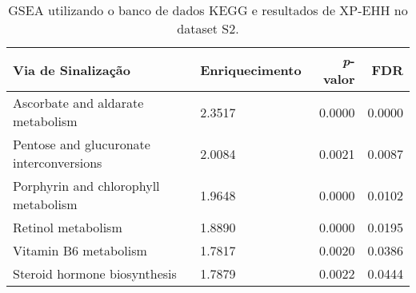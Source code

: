 \begin{table}[!htbp]
\centering

\begin{tabularx}{.9\textwidth}{Xlrr}

\toprule
Via de Sinalização & Enriquecimento & \emph{p}-valor & FDR\\
\midrule
Ascorbate and aldarate metabolism & 2.3517 & 0.0000 & 0.0000\\
Pentose and glucuronate interconversions & 2.0084 & 0.0021 & 0.0087\\
Porphyrin and chlorophyll metabolism & 1.9648 & 0.0000 & 0.0102\\
Retinol metabolism & 1.8890 & 0.0000 & 0.0195\\
Vitamin B6 metabolism & 1.7817 & 0.0020 & 0.0386\\
Steroid hormone biosynthesis & 1.7879 & 0.0022 & 0.0444\\

\bottomrule
\end{tabularx}

\caption{GSEA utilizando o banco de dados KEGG e resultados de XP-EHH no dataset S2.}
\label{tab:gsea}

\end{table}
